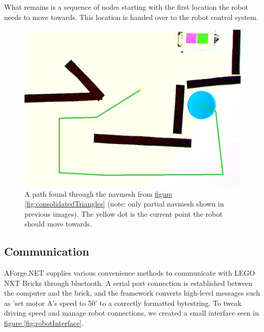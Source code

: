 \documentclass[10pt, abstracton, twocolumn]{scrartcl}
\newcommand{\fref}[1]{\hyperref[#1]{figure \vref{#1}}}
\begin{document}
What remains is a sequence of nodes starting with the first location the robot needs to move towards. This location is handed over to the robot control system.

\begin{figure}[h]
        \centering
        \includegraphics[width=\columnwidth]{pictures/computedPath.png}
        \caption{\small A path found through the navmesh from \fref{fig:consolidatedTriangles} (note: only partial navmesh shown in previous images). The yellow dot is the current point the robot should move towards.}
        \label{fig:computedPath}
\end{figure}

\subsection{Communication}
AForge.NET supplies various convenience methods to communicate with LEGO NXT Bricks through bluetooth. A serial port connection is established between the computer and the brick, and the framework converts high-level messages such as 'set motor A's speed to 50' to a correctly formatted bytestring. To tweak driving speed and manage robot connections, we created a small interface seen in \fref{fig:robotInterface}.
\end{document}
